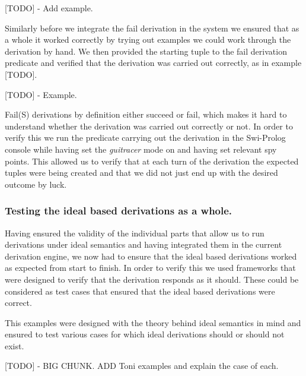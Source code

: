 [TODO] - Add example.

Similarly before we integrate the fail derivation in the system we ensured that as a whole it worked correctly by trying out examples we could work through the derivation by hand. We then provided the starting tuple to the fail derivation predicate and verified that the derivation was carried out correctly, as in example [TODO].

[TODO] - Example.

Fail(S) derivations by definition either succeed or fail, which makes it hard to understand whether the derivation was carried out correctly or not. In order to verify this we run the predicate carrying out the derivation in the Swi-Prolog console while having set the \emph{guitracer} mode on and having set relevant spy points. This allowed us to verify that at each turn of the derivation the expected tuples were being created and that we did not just end up with the desired outcome by luck.

\subsubsection{Testing the ideal based derivations as a whole.}
Having ensured the validity of the individual parts that allow us to run derivations under ideal semantics and having integrated them in the current derivation engine, we now had to ensure that the ideal based derivations worked as expected from start to finish. In order to verify this we used frameworks that were designed to verify that the derivation responds as it should. These could be considered as test cases that ensured that the ideal based derivations were correct.

This examples were designed with the theory behind ideal semantics in mind and ensured to test various cases for which ideal derivations should or should not exist.

[TODO] - BIG CHUNK. ADD Toni examples and explain the case of each.